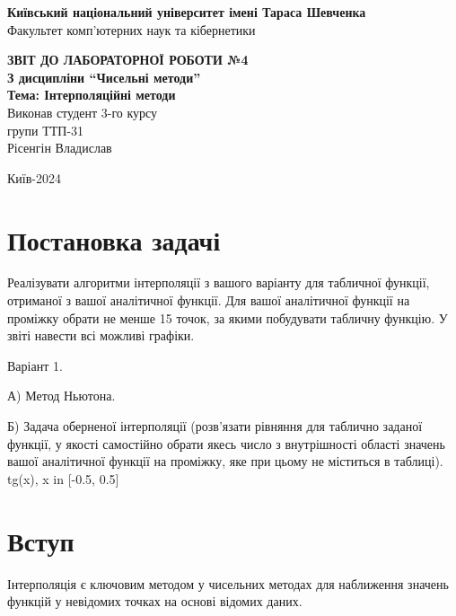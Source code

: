 \documentclass[a4paper, 12pt]{article}
\begin{document}
\begin{titlepage}
	\begin{center}
		\Large
		\textbf{Київський національний університет імені Тараса Шевченка} \\
		Факультет комп'ютерних наук та кібернетики \\

		\vspace{6cm}

		\textbf{\LARGE ЗВІТ ДО ЛАБОРАТОРНОЇ РОБОТИ №4} \\[0.5cm]
		\textbf{З дисципліни ``Чисельні методи''} \\[0.5cm]
		\textbf{Тема: Інтерполяційні методи} \\

		\vfill
		\hspace{7cm} Виконав студент 3-го курсу \\
		\hspace{7cm} групи ТТП-31 \\
		\hspace{7cm} Рісенгін Владислав \\
		\vspace{2cm}

		Київ-2024
	\end{center}
\end{titlepage}

\newpage


\section{Постановка задачі}

Реалізувати алгоритми інтерполяції з вашого варіанту для табличної функції, отриманої з вашої аналітичної функції. Для вашої аналітичної функції на проміжку обрати не менше 15 точок, за якими побудувати табличну функцію. У звіті навести всі можливі графіки. 

Варіант 1.

А) Метод Ньютона.

Б) Задача оберненої інтерполяції (розв’язати рівняння  для таблично заданої функції, у якості  самостійно обрати якесь число з внутрішності області значень вашої аналітичної функції на проміжку, яке при цьому не міститься в таблиці).
tg(x), x in [-0.5, 0.5]

\section{Вступ}
Інтерполяція є ключовим методом у чисельних методах для наближення значень функцій у невідомих точках на основі відомих даних.
\end{document}
